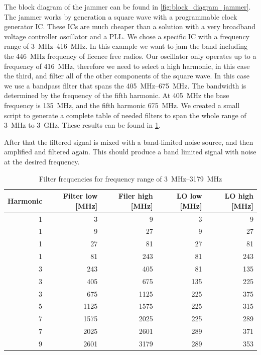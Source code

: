 \documentclass[a4paper, openany, oneside]{memoir}
\begin{document}
The block diagram of the jammer can be found in \cref{fig:block_diagram_jammer}. The jammer works by generation a square wave with a programmable clock generator IC\@. These ICs are much cheaper than a solution with a very broadband voltage controller oscillator and a PLL\@. We chose a specific IC with a frequency range of \SIrange{3}{416}{\mega\hertz}. In this example we want to jam the band including the \SI{446}{\mega\hertz} frequency of licence free radios. Our oscillator only operates up to a frequency of \SI{416}{\mega\hertz}, therefore we need to select a high harmonic, in this case the third, and filter all of the other components of the square wave. In this case we use a bandpass filter that spans the \SIrange{405}{675}{\mega\hertz}. The bandwidth is determined by the frequency of the fifth harmonic. At \SI{405}{\mega\hertz} the base frequency is \SI{135}{\mega\hertz}, and the fifth harmonic \SI{675}{\mega\hertz}. We created a small script to generate a complete table of needed filters to span the whole range of \SI{3}{\mega\hertz} to \SI{3}{\giga\hertz}. These results can be found in \cref{tab:filter_freqs}.

After that the filtered signal is mixed with a band-limited noise source, and then amplified and filtered again. This should produce a band limited signal with noise at the desired frequency.

\begin{table}[h]
\centering
\caption{Filter frequencies for frequency range of \SIrange{3}{3179}{\mega\hertz}}
\label{tab:filter_freqs}
\begin{adjustbox}{max width=\textwidth}
\begin{tabular}{rrrrr}
\toprule
   Harmonic &   Filter low [\si{\mega\hertz}] &   Filer high [\si{\mega\hertz}] &   LO low [\si{\mega\hertz}] &   LO high [\si{\mega\hertz}] \\
\midrule
          1 &            3 &            9 &        3 &         9 \\
          1 &            9 &           27 &        9 &        27 \\
          1 &           27 &           81 &       27 &        81 \\
          1 &           81 &          243 &       81 &       243 \\
          3 &          243 &          405 &       81 &       135 \\
          3 &          405 &          675 &      135 &       225 \\
          3 &          675 &         1125 &      225 &       375 \\
          5 &         1125 &         1575 &      225 &       315 \\
          7 &         1575 &         2025 &      225 &       289 \\
          7 &         2025 &         2601 &      289 &       371 \\
          9 &         2601 &         3179 &      289 &       353 \\
\bottomrule
\end{tabular}
\end{adjustbox}
\end{table}
\end{document}
